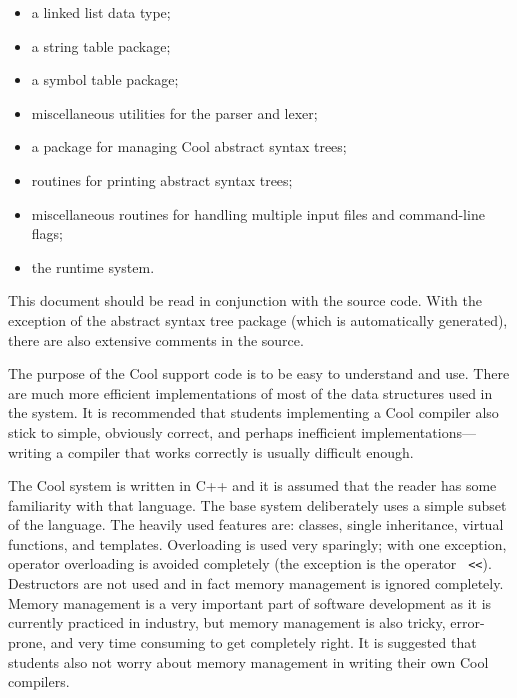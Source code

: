 \begin{itemize}

\item a linked list data type;

\item a string table package;

\item a symbol table package;

\item miscellaneous utilities for the parser and lexer; 

\item a package for managing Cool abstract syntax trees;

\item routines for printing abstract syntax trees;

\item miscellaneous routines for handling multiple input files and
	command-line flags;

\item the runtime system.


\end{itemize}

This document should be read in conjunction with the source code.  With
the exception of the abstract syntax tree package (which is automatically
generated), there are also extensive comments in the source. 

The purpose of the Cool support code is 
to be easy to understand and use.  There are much more efficient
implementations of most of the data structures used in the system.  It
is recommended that students implementing a Cool compiler also stick
to simple, obviously correct, and perhaps inefficient
implementations---writing a compiler that works 
correctly is usually difficult enough.

The Cool system is written in C++ and it is assumed that the reader
has some familiarity with that language.  The base system deliberately
uses a simple subset of the language.  The heavily used features are:
classes, single inheritance, virtual functions, and templates.
Overloading is used very sparingly; with one exception, operator
overloading is avoided completely (the exception is the operator {\tt
<<}).  Destructors are not used and in fact memory management is
ignored completely.  Memory management is a very important part of
software development as it is currently practiced in industry, but
memory management is also tricky, error-prone, and very time consuming
to get completely right.  It is suggested that students also not
worry about memory management in writing their own Cool compilers.

